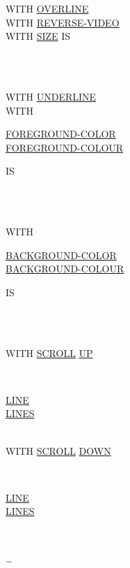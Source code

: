 \documentclass[a4paper,oneside,svgnames]{scrbook}
\makeatletter
\newcommand{\key}[1]{\underline{#1}}
\newcommand{\miscext}[1]{%
  \colorbox{blue!50}{#1}}
\newenvironment{0-1}{$\left[ \begin{tabular}{@{}l@{}}}{\end{tabular} \right]$}
\newenvironment{1=}{$\left\{ \begin{tabular}{@{}l@{}}}{\end{tabular} \right\}$}
\makeatother
\begin{document}
\begin{1=}
{\begin{0-1}
      WITH \key{OVERLINE} \\

      WITH \key{REVERSE-VIDEO} \\

      WITH \key{SIZE} IS
      \begin{1=}
        \identifier \\
        \literal
      \end{1=} \\

      WITH \key{UNDERLINE} \\

      WITH
      \begin{1=}
        \key{FOREGROUND-COLOR} \\
        \key{FOREGROUND-COLOUR}
      \end{1=}
      IS
      \begin{1=}
        \identifier \\
        \integer
      \end{1=} \\

      WITH
      \begin{1=}
        \key{BACKGROUND-COLOR} \\
        \key{BACKGROUND-COLOUR}
      \end{1=}
      IS
      \begin{1=}
        \identifier \\
        \integer
      \end{1=} \\

      WITH \key{SCROLL} \key{UP}
      \begin{0-1}
        \identifier \\
        \integer
      \end{0-1}
      \begin{1=}
        \key{LINE} \\
        \key{LINES}
      \end{1=} \\

      WITH \key{SCROLL} \key{DOWN}
      \begin{0-1}
        \identifier \\
        \integer
      \end{0-1}
      \begin{1=}
        \key{LINE} \\
        \key{LINES}
      \end{1=} \\
    \end{0-1}
  }
\end{1=} \miscext{\ldots}
\end{document}

